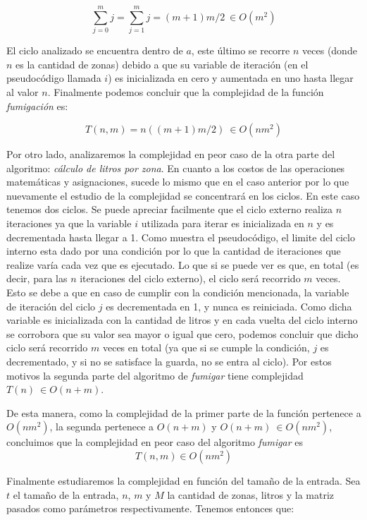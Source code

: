 \documentclass[a4paper,10pt] {article}
\begin{document}
$$\sum_{j=0}^{m}j=\sum_{j=1}^{m}j=(m+1)m/2\ \in O(m^{2})  $$

El ciclo analizado se encuentra dentro de $a$, este \'ultimo se recorre $n$ veces (donde $n$ es la cantidad de zonas) debido a que su variable de iteraci\'on (en el pseudoc\'odigo llamada $i$) es inicializada en cero y aumentada en uno hasta llegar al valor $n$. Finalmente podemos concluir que la complejidad de la funci\'on \textit{fumigaci\'on} es:

$$T(n,m)=n((m+1)m/2)\ \in O(nm^{2})$$


Por otro lado, analizaremos la complejidad en peor caso de la otra parte del algoritmo: \textit{c\'alculo de litros por zona}. En cuanto a los costos de las operaciones matem\'aticas y asignaciones, sucede lo mismo que en el caso anterior por lo que nuevamente el estudio de la complejidad se concentrar\'a en los ciclos. En este caso tenemos dos ciclos. Se puede apreciar facilmente que el ciclo externo realiza $n$ iteraciones ya que la variable $i$ utilizada para iterar es inicializada en $n$ y es decrementada hasta llegar a 1. Como muestra el pseudoc\'odigo, el limite del ciclo interno esta dado por una condici\'on por lo que la cantidad de iteraciones que realize var\'ia cada vez que es ejecutado. Lo que si se puede ver es que, en total (es decir, para las $n$ iteraciones del ciclo externo), el ciclo ser\'a recorrido $m$ veces. Esto se debe a que en caso de cumplir con la condici\'on mencionada, la variable de iteraci\'on del ciclo $j$ es decrementada en 1, y nunca es reiniciada. Como dicha variable es inicializada con la cantidad de litros y en cada vuelta del ciclo interno se corrobora que su valor sea mayor o igual que cero, podemos concluir que dicho ciclo ser\'a recorrido $m$ veces en total (ya que si se cumple la condici\'on, $j$ es decrementado, y si no se satisface la guarda, no se entra al ciclo). Por estos motivos la segunda parte del algoritmo de \textit{fumigar} tiene complejidad $T(n)\ \in O(n+m)$.


De esta manera, como la complejidad de la primer parte de la funci\'on pertenece a $O(nm^{2})$, la segunda pertenece a $O(n+m)$ y $O(n+m)\ \in O(nm^{2})$, concluimos que la complejidad en peor caso del algoritmo \textit{fumigar} es $$T(n,m) \in O(nm^{2})$$


Finalmente estudiaremos la complejidad en funci\'on del tama\~{n}o de la entrada. Sea $t$ el tama\~{n}o de la entrada, $n$, $m$ y $M$ la cantidad de zonas, litros y la matriz pasados como par\'ametros respectivamente. Tenemos entonces que:
\end{document}
